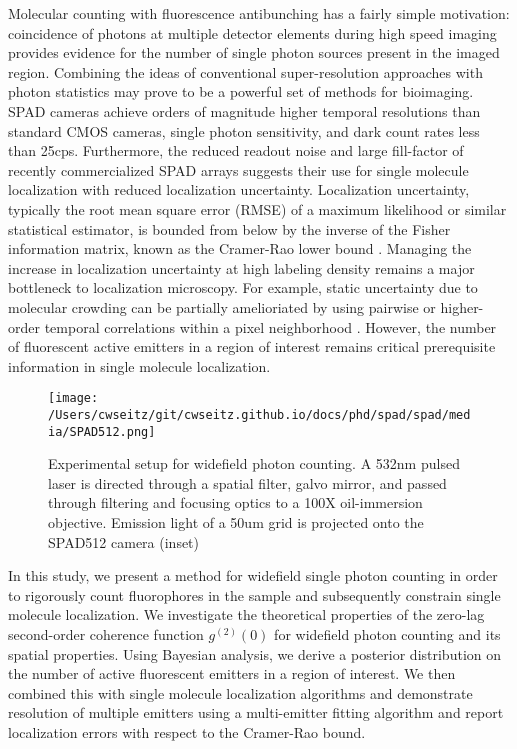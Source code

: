 Molecular counting with fluorescence antibunching has a fairly simple motivation: coincidence of photons at multiple detector elements during high speed imaging provides evidence for the number of single photon sources present in the imaged region. Combining the ideas of conventional super-resolution approaches with photon statistics may prove to be a powerful set of methods for bioimaging. SPAD cameras achieve orders of magnitude higher temporal resolutions than standard CMOS cameras, single photon sensitivity, and dark count rates less than 25cps. Furthermore, the reduced readout noise and large fill-factor of recently commercialized SPAD arrays suggests their use for single molecule localization with reduced localization uncertainty. Localization uncertainty, typically the root mean square error (RMSE) of a maximum likelihood or similar statistical estimator, is bounded from below by the inverse of the Fisher information matrix, known as the Cramer-Rao lower bound \parencite{Chao2016}. Managing the increase in localization uncertainty at high labeling density remains a major bottleneck to localization microscopy. For example, static uncertainty due to molecular crowding can be partially amelioriated by using pairwise or higher-order temporal correlations within a pixel neighborhood \parencite{Dertinger2009}. However, the number of fluorescent active emitters in a region of interest remains critical prerequisite information in single molecule localization.

\begin{figure*}[t]
\centering
\texttt{[image: /Users/cwseitz/git/cwseitz.github.io/docs/phd/spad/spad/media/SPAD512.png]}
\caption{Experimental setup for widefield photon counting. A 532nm pulsed laser is directed through a spatial filter, galvo mirror, and passed through filtering and focusing optics to a 100X oil-immersion objective. Emission light of a 50um grid is projected onto the SPAD512 camera (inset)}
\end{figure*}    


In this study, we present a method for widefield single photon counting in order to rigorously count fluorophores in the sample and subsequently constrain single molecule localization. We investigate the theoretical properties of the zero-lag second-order coherence function $g^{(2)}(0)$ for widefield photon counting and its spatial properties. Using Bayesian analysis, we derive a posterior distribution on the number of active fluorescent emitters in a region of interest. We then combined this with single molecule localization algorithms and demonstrate resolution of multiple emitters using a multi-emitter fitting algorithm and report localization errors with respect to the Cramer-Rao bound.

